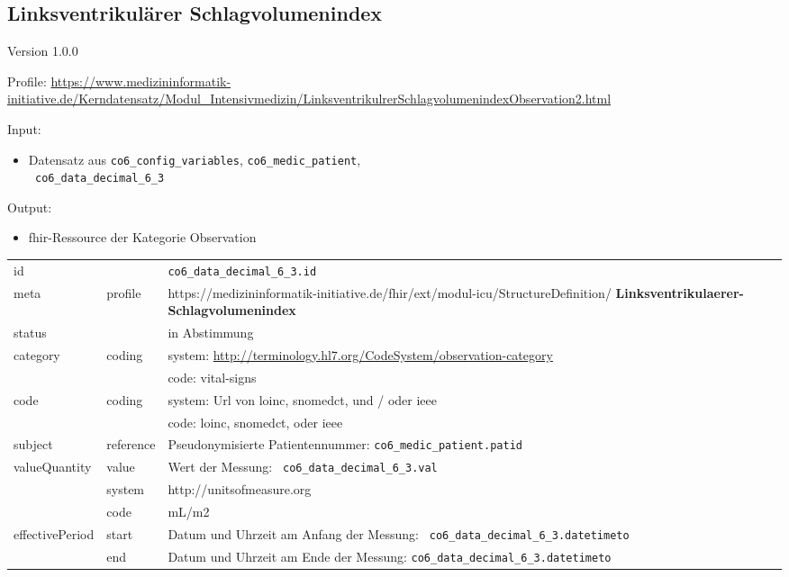 \subsection{Linksventrikulärer Schlagvolumenindex} 
\noindent Version 1.0.0

\noindent Profile: \url{https://www.medizininformatik-initiative.de/Kerndatensatz/Modul_Intensivmedizin/LinksventrikulrerSchlagvolumenindexObservation2.html}

\noindent Input:
\begin{itemize}
	\item Datensatz aus \texttt{co6\_config\_variables}, \texttt{co6\_medic\_patient}, \\ \texttt{
co6\_data\_decimal\_6\_3}
\end{itemize}
Output:
\begin{itemize}
        \item \ac{fhir}-Ressource der Kategorie \glqq Observation\grqq{}
\end{itemize}
\begin{longtable}{|l|l|p{7.5cm}|}
        \hline
        \rowcolor{lightgray} \multicolumn{3}{|l|}{Data Mapping (inhaltlich)} \\ \hline
        id &  & \texttt{co6\_data\_decimal\_6\_3.id} \\ \hline
	meta & profile & https://medizininformatik-initiative.de/fhir/ext/modul-icu/StructureDefinition/\textbf{
Linksventrikulaerer-Schlagvolumenindex} \\ \hline 
	status &  & in Abstimmung  \\ \hline 
	category & coding & system: \url{http://terminology.hl7.org/CodeSystem/observation-category} \\
\cline{3-3}
	& & code: vital-signs \\ \hline
	code & coding & system: Url von \ac{loinc}, \ac{snomedct}, und / oder \ac{ieee} \\ 
	\cline{3-3} 
	 &  & code: \ac{loinc}, \ac{snomedct}, oder \ac{ieee} \\ \hline
	subject & reference & Pseudonymisierte Patientennummer: \texttt{co6\_medic\_patient.patid} \\ \hline
	valueQuantity & value & Wert der Messung: \texttt{
co6\_data\_decimal\_6\_3.val} \\
        \cline{2-3}
         & system & http://unitsofmeasure.org \\
         \cline{2-3}
         & code & mL/m2 \\ \hline
    effectivePeriod & start & Datum und Uhrzeit am Anfang der Messung: \texttt{
co6\_data\_decimal\_6\_3.datetimeto} \\
    \cline{2-3}
     & end & Datum und Uhrzeit am Ende der Messung: \texttt{co6\_data\_decimal\_6\_3.datetimeto} \\ \hline
\end{longtable}


